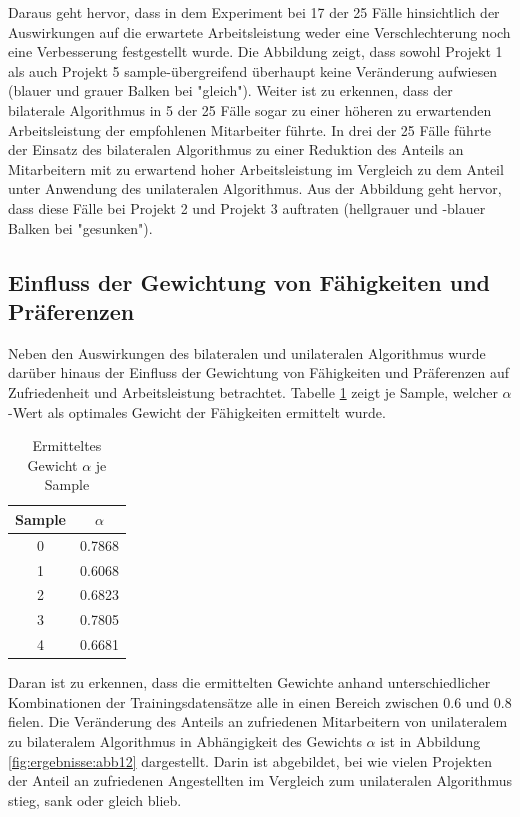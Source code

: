 Daraus geht hervor, dass in dem Experiment bei 17 der 25 Fälle hinsichtlich der Auswirkungen auf die erwartete Arbeitsleistung weder eine Verschlechterung noch eine Verbesserung festgestellt wurde.
Die Abbildung zeigt, dass sowohl Projekt 1 als auch Projekt 5 sample-übergreifend überhaupt keine Veränderung aufwiesen (blauer und grauer Balken bei "gleich").
Weiter ist zu erkennen, dass der bilaterale Algorithmus in 5 der 25 Fälle sogar zu einer höheren zu erwartenden Arbeitsleistung der empfohlenen Mitarbeiter führte. 
In drei der 25 Fälle führte der Einsatz des bilateralen Algorithmus zu einer Reduktion des Anteils an Mitarbeitern mit zu erwartend hoher Arbeitsleistung im Vergleich zu dem Anteil unter Anwendung des unilateralen Algorithmus.
Aus der Abbildung geht hervor, dass diese Fälle bei Projekt 2 und Projekt 3 auftraten (hellgrauer und -blauer Balken bei "gesunken").

\subsection{Einfluss der Gewichtung von Fähigkeiten und Präferenzen}
Neben den Auswirkungen des bilateralen und unilateralen Algorithmus wurde darüber hinaus der Einfluss der Gewichtung von Fähigkeiten und Präferenzen auf Zufriedenheit und Arbeitsleistung betrachtet.
Tabelle \ref{tab:ergebnisse:tab1} zeigt je Sample, welcher $\alpha$-Wert als optimales Gewicht der Fähigkeiten ermittelt wurde.

\begin{table}[htbp]
    \begin{center}
    \begin{tabular}{c|c}
    {\textbf{Sample}} & {\boldmath$\alpha$}\\
    \hline
    0 & 0.7868 \\
    \hline
	1 & 0.6068 \\
    \hline
    2 & 0.6823 \\
    \hline
	3 & 0.7805 \\
    \hline
	4 & 0.6681 \\
    \end{tabular}
    \end{center}
    \caption[Ermitteltes Gewicht $\alpha$ je Sample]{Ermitteltes Gewicht $\alpha$ je Sample}
	\label{tab:ergebnisse:tab1}
\end{table}

Daran ist zu erkennen, dass die ermittelten Gewichte anhand unterschiedlicher Kombinationen der Trainingsdatensätze alle in einen Bereich zwischen 0.6 und 0.8 fielen.
Die Veränderung des Anteils an zufriedenen Mitarbeitern von unilateralem zu bilateralem Algorithmus in Abhängigkeit des Gewichts $\alpha$ ist in Abbildung \ref{fig:ergebnisse:abb12} dargestellt.
Darin ist abgebildet, bei wie vielen Projekten der Anteil an zufriedenen Angestellten im Vergleich zum unilateralen Algorithmus stieg, sank oder gleich blieb.

